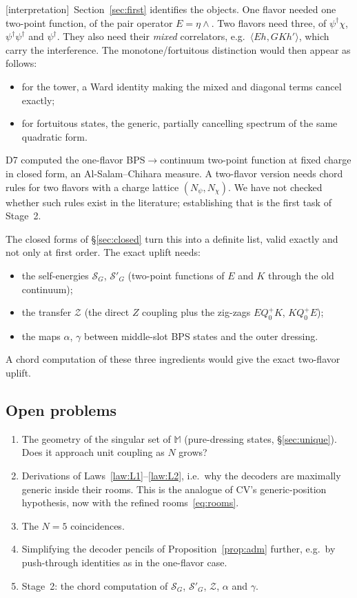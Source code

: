\documentclass[11pt]{article}
\newcommand{\ip}[2]{\langle #1,#2\rangle}
\newcommand{\Zc}{\mathcal Z}
\newcommand{\Mb}{\mathbb M}
\newcommand{\SG}{\mathcal S_G}
\newcommand{\SGp}{\mathcal S'_G}
\newcommand{\tagbox}[2]{\textsf{\small\color{#1}[#2]}}
\newcommand{\INTERP}{\tagbox{cconj}{interpretation}}
\theoremstyle{plain}
\theoremstyle{remark}
\numberwithin{equation}{section}
\begin{document}
\INTERP\ Section~\ref{sec:first} identifies the objects. One flavor needed one two-point function, of the pair operator
$E=\eta\wedge$. Two flavors need three, of $\psi^\dagger\chi$, $\psi^\dagger\psi^\dagger$ and $\psi^\dagger$. They also
need their \emph{mixed} correlators, e.g.\ $\ip{Eh}{GKh'}$, which carry the interference. The monotone/fortuitous
distinction would then appear as follows:
\begin{itemize}\itemsep2pt
\item for the tower, a Ward identity making the mixed and diagonal terms cancel exactly;
\item for fortuitous states, the generic, partially cancelling spectrum of the same quadratic form.
\end{itemize}
D7 computed the one-flavor BPS$\to$continuum two-point function at fixed charge in closed form, an Al-Salam--Chihara
measure. A two-flavor version needs chord rules for two flavors with a charge lattice $(N_\psi,N_\chi)$. We have not
checked whether such rules exist in the literature; establishing that is the first task of Stage~2.

The closed forms of \S\ref{sec:closed} turn this into a definite list, valid exactly and not only at first order. The
exact uplift needs:
\begin{itemize}\itemsep2pt
\item the self-energies $\SG$, $\SGp$ (two-point functions of $E$ and $K$ through the old continuum);
\item the transfer $\Zc$ (the direct $Z$ coupling plus the zig-zags $EQ_0^+K$, $KQ_0^+E$);
\item the maps $\alpha$, $\gamma$ between middle-slot BPS states and the outer dressing.
\end{itemize}
A chord computation of these three ingredients would give the exact two-flavor uplift.

\subsection{Open problems}

\begin{enumerate}\itemsep2pt
\item The geometry of the singular set of $\Mb$ (pure-dressing states, \S\ref{sec:unique}). Does it approach unit
  coupling as $N$ grows?
\item Derivations of Laws~\ref{law:L1}--\ref{law:L2}, i.e.\ why the decoders are maximally generic inside their rooms.
  This is the analogue of CV's generic-position hypothesis, now with the refined rooms~\eqref{eq:rooms}.
\item The $N=5$ coincidences.
\item Simplifying the decoder pencils of Proposition~\ref{prop:adm} further, e.g.\ by push-through identities as in
  the one-flavor case.
\item Stage~2: the chord computation of $\SG$, $\SGp$, $\Zc$, $\alpha$ and $\gamma$.
\end{enumerate}
\end{document}
